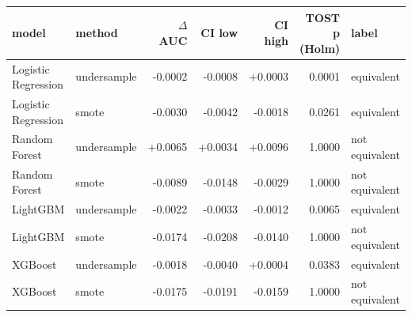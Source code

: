 \begin{tabular}{llrrrrl}
\toprule
model & method & $\Delta$ AUC & CI low & CI high & TOST p (Holm) & label \\
\midrule
Logistic Regression & undersample & -0.0002 & -0.0008 & +0.0003 & 0.0001 & equivalent \\
Logistic Regression & smote & -0.0030 & -0.0042 & -0.0018 & 0.0261 & equivalent \\
Random Forest & undersample & +0.0065 & +0.0034 & +0.0096 & 1.0000 & not equivalent \\
Random Forest & smote & -0.0089 & -0.0148 & -0.0029 & 1.0000 & not equivalent \\
LightGBM & undersample & -0.0022 & -0.0033 & -0.0012 & 0.0065 & equivalent \\
LightGBM & smote & -0.0174 & -0.0208 & -0.0140 & 1.0000 & not equivalent \\
XGBoost & undersample & -0.0018 & -0.0040 & +0.0004 & 0.0383 & equivalent \\
XGBoost & smote & -0.0175 & -0.0191 & -0.0159 & 1.0000 & not equivalent \\
\bottomrule
\end{tabular}

